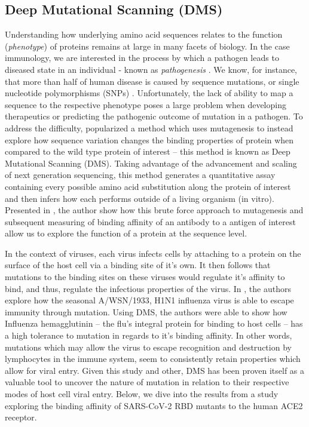\documentclass{article}
\begin{document}
\subsection*{Deep Mutational Scanning (DMS)}

Understanding how underlying amino acid sequences relates to the function (\textit{phenotype}) of proteins remains at large in many facets of biology.
In the case immunology, we are interested in the process by which a pathogen leads to diseased state in an individual - known as \textit{pathogenesis} \citep{Araya2011, Fowler2014, Weile2018}.
We know, for instance, that more than half of human disease is caused by sequence mutations, or single nucleotide polymorphisms (SNPs) \citep{Stenson2009}.
Unfortunately, the lack of ability to map a sequence to the respective phenotype poses a large problem when developing therapeutics or predicting the pathogenic outcome of mutation in a pathogen.
To address the difficulty, \citep{Araya2011} popularized a method which uses mutagenesis to instead explore how sequence variation changes the binding properties of protein when compared to the wild type protein of interest -- this method is known as Deep Mutational Scanning (DMS).
Taking advantage of the advancement and scaling of next generation sequencing, this method generates a quantitative assay containing every possible amino acid substitution along the protein of interest and then infers how each performs outside of a living organism (in vitro).
Presented in \citet{Adams2016}, the author show how this brute force approach to mutagenesis and subsequent measuring of binding affinity of an antibody to a antigen of interest allow us to explore the function of a protein at the sequence level.

In the context of viruses, each virus infects cells by attaching to a protein on the surface of the host cell via a binding site of it's own.
It then follows that mutations to the binding sites on these viruses would regulate it's affinity to bind, and thus, regulate the infectious properties of the virus.
In \citet{Bloom2014}, the authors explore how the seasonal A/WSN/1933, H1N1 influenza virus is able to escape immunity through mutation.
Using DMS, the authors were able to show how Influenza hemagglutinin -- the flu's integral protein for binding to host cells -- has a high tolerance to mutation in regards to it's binding affinity.
In other words, mutations which may allow the virus to escape recognition and destruction by lymphocytes in the immune system, seem to consistently retain properties which allow for viral entry.
Given this study and other, DMS has been proven itself as a valuable tool to uncover the nature of mutation in relation to their respective modes of host cell viral entry.
Below, we dive into the results from a study exploring the binding affinity of SARS-CoV-2 RBD mutants to the human ACE2 receptor.
\end{document}
